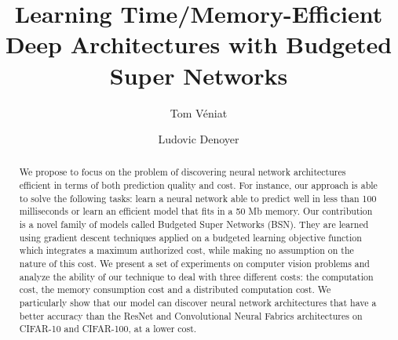\documentclass[10pt,twocolumn,letterpaper]{article}
\begin{document}
\title{Learning Time/Memory-Efficient Deep Architectures with Budgeted Super Networks}



\author[*]{Tom V\'eniat}
\author[*,\dag]{Ludovic Denoyer}

\maketitle
\thispagestyle{empty}

\begin{abstract}
 We propose to focus on the problem of discovering neural network architectures efficient in terms of both prediction quality and cost. For instance, our approach is able to solve the following tasks: learn a neural network able to predict well in less than 100 milliseconds or learn an efficient model that fits in a 50 Mb memory. Our contribution is a novel family of models called Budgeted Super Networks (BSN). They are learned using gradient descent techniques applied on a budgeted learning objective function which integrates a maximum authorized cost, while making no assumption on the nature of this cost. We present a set of experiments on computer vision problems and analyze the ability of our technique to deal with three different costs: the computation cost, the memory consumption cost and a distributed computation cost. We particularly show that our model can discover neural network architectures that have a better accuracy than the ResNet and Convolutional Neural Fabrics architectures on CIFAR-10 and CIFAR-100, at a lower cost. 

\end{abstract}
\end{document}
